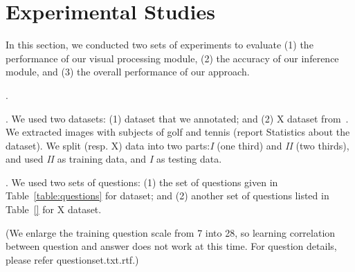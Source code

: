 \section{Experimental Studies}
\label{sec-expt}

In this section, we conducted two sets of experiments to evaluate (1) the performance of our visual processing module, (2) the accuracy of our inference module, and (3) the overall performance of our approach. 

. %

. We used two datasets: (1)  dataset that we annotated; and (2) X dataset from~\cite{}. We extracted images with subjects of golf and tennis (report Statistics about the dataset). We split  (resp. X) data into two parts:{\em  I} (one third) and {\em II} (two thirds), and used {\em II} as training data, and {\em I} as testing data. 

. We used two sets of questions: (1) the set of questions given in Table~\ref{table:questions} for  dataset; and (2) another set of questions listed in Table~\ref{} for X dataset. 

(We enlarge the training question scale from 7 into 28, so learning correlation between question and answer does not work at this time. For question details, please refer questionset.txt.rtf.)





